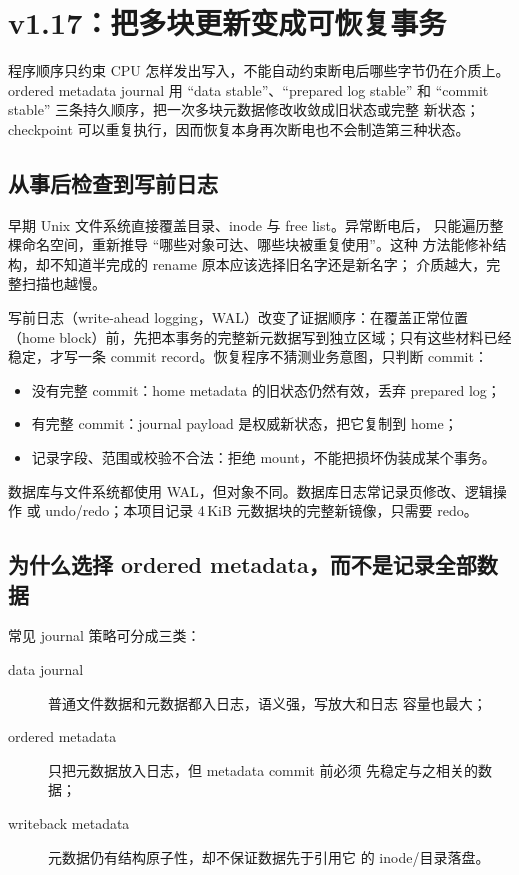 \section{v1.17：把多块更新变成可恢复事务}

\begin{keyidea}
程序顺序只约束 CPU 怎样发出写入，不能自动约束断电后哪些字节仍在介质上。
ordered metadata journal 用 ``data stable''、``prepared log stable'' 和
``commit stable'' 三条持久顺序，把一次多块元数据修改收敛成旧状态或完整
新状态；checkpoint 可以重复执行，因而恢复本身再次断电也不会制造第三种状态。
\end{keyidea}

\subsection{从事后检查到写前日志}

早期 Unix 文件系统直接覆盖目录、inode 与 free list。异常断电后，
只能遍历整棵命名空间，重新推导 ``哪些对象可达、哪些块被重复使用''。这种
方法能修补结构，却不知道半完成的 rename 原本应该选择旧名字还是新名字；
介质越大，完整扫描也越慢。

写前日志（write-ahead logging，WAL）改变了证据顺序：在覆盖正常位置
（home block）前，先把本事务的完整新元数据写到独立区域；只有这些材料已经
稳定，才写一条 commit record。恢复程序不猜测业务意图，只判断 commit：

\begin{itemize}
  \item 没有完整 commit：home metadata 的旧状态仍然有效，丢弃 prepared log；
  \item 有完整 commit：journal payload 是权威新状态，把它复制到 home；
  \item 记录字段、范围或校验不合法：拒绝 mount，不能把损坏伪装成某个事务。
\end{itemize}

数据库与文件系统都使用 WAL，但对象不同。数据库日志常记录页修改、逻辑操作
或 undo/redo；本项目记录 4\,KiB 元数据块的完整新镜像，只需要 redo。

\subsection{为什么选择 ordered metadata，而不是记录全部数据}

常见 journal 策略可分成三类：

\begin{description}
  \item[data journal] 普通文件数据和元数据都入日志，语义强，写放大和日志
    容量也最大；
  \item[ordered metadata] 只把元数据放入日志，但 metadata commit 前必须
    先稳定与之相关的数据；
  \item[writeback metadata] 元数据仍有结构原子性，却不保证数据先于引用它
    的 inode/目录落盘。
\end{description}

